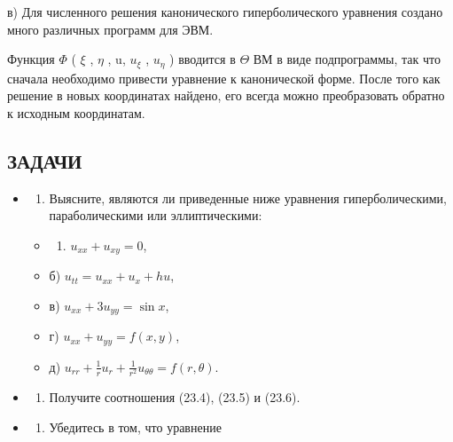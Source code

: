 \documentclass[
  ukrainian,
]{article}
\providecommand{\tightlist}{%
  \setlength{\itemsep}{0pt}\setlength{\parskip}{0pt}}
\begin{document}
в) Для численного решения канонического гиперболического уравнения
создано много различных программ для ЭВМ.

Функция \(\Phi\) ( \(\xi\) , \(\eta\) , u, \(u_{\xi}\) , \(u_{\eta}\) )
вводится в \(\Theta\) ВМ в виде подпрограммы, так что сначала необходимо
привести уравнение к канонической форме. После того как решение в новых
координатах найдено, его всегда можно преобразовать обратно к исходным
координатам.

\subsection{ЗАДАЧИ}\label{ux437ux430ux434ux430ux447ux438-3}

\begin{itemize}
\item
  \begin{enumerate}
  \def\labelenumi{\arabic{enumi}.}
  \tightlist
  \item
    Выясните, являются ли приведенные ниже уравнения гиперболическими,
    параболическими или эллиптическими:
  \end{enumerate}

  \begin{itemize}
  \tightlist
  \item
    \begin{enumerate}
    \def\labelenumi{\alph{enumi})}
    \tightlist
    \item
      \(u_{xx}+u_{xy}=0\),
    \end{enumerate}
  \item
    б) \(u_{tt}=u_{xx}+u_x+hu\),
  \item
    в) \(u_{xx}+3u_{yy}=\sin x\),
  \item
    г) \(u_{xx}+u_{yy}=f(x,y)\),
  \item
    д)
    \(u_{rr}+\frac{1}{r}u_r+\frac{1}{r^2}u_{\theta\theta}=f(r,\theta)\).
  \end{itemize}
\item
  \begin{enumerate}
  \def\labelenumi{\arabic{enumi}.}
  \setcounter{enumi}{1}
  \tightlist
  \item
    Получите соотношения (23.4), (23.5) и (23.6).
  \end{enumerate}
\item
  \begin{enumerate}
  \def\labelenumi{\arabic{enumi}.}
  \setcounter{enumi}{2}
  \tightlist
  \item
    Убедитесь в том, что уравнение
  \end{enumerate}
\end{itemize}
\end{document}
